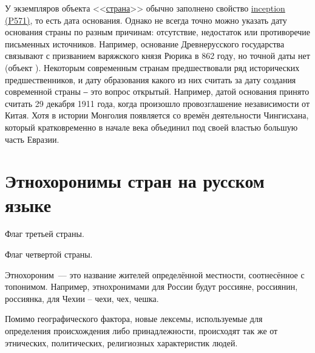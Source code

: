 У экземпляров объекта <<\href{https://www.wikidata.org/wiki/Q6256}{страна}>> обычно заполнено свойство \href{https://www.wikidata.org/wiki/Property:P571}{inception (P571)}, то есть дата основания. Однако не всегда точно можно  указать дату основания страны по разным причинам: отсутствие, недостаток или противоречие письменных источников. Например, основание Древнерусского государства связывают с призванием варяжского князя Рюрика в 862 году, но точной даты нет (объект ). Некоторым современным странам предшествовали ряд исторических предшественников, и дату образования какого из них считать за дату создания современной страны ‒ это вопрос открытый. Например, датой основания  принято считать 29 декабря 1911 года, когда произошло провозглашение независимости от Китая. Хотя в истории Монголия появляется со времён деятельности Чингисхана, который кратковременно в начале \MakeUppercase{} века объединил под своей властью большую часть Евразии.



\section{Этнохоронимы стран на русском языке}

\begin{marginfigure}[0.0cm]
	{
		\setlength{\fboxsep}{0pt}%
		\setlength{\fboxrule}{1pt}%
	}
	\caption{Флаг третьей страны.}%
	\label{fig:flag_israel}%
\end{marginfigure}
\begin{marginfigure}[0.0cm]
	{
		\setlength{\fboxsep}{0pt}%
		\setlength{\fboxrule}{1pt}%
	}
	\caption{Флаг четвертой страны.}%
	\label{fig:flag_mongolia}%
\end{marginfigure}

Этнохороним~--- это название жителей определённой местности, соотнесённое с топонимом. Например, этнохронимами для России будут россияне, россиянин, россиянка, для Чехии – чехи, чех, чешка.

Помимо географического фактора, новые лексемы, используемые для определения происхождения либо принадлежности, происходят так же от этнических, политических, религиозных характеристик людей\autocite{Zhuravleva2012}. 

